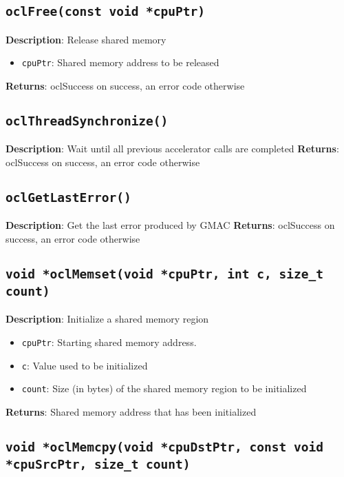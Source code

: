 \subsection{\texttt{oclFree(const void *cpuPtr)}}

\textbf{Description}: Release shared memory
\begin{itemize}
  \item \texttt{cpuPtr}: Shared memory address to be released
\end{itemize}
\textbf{Returns}: oclSuccess on success, an error code otherwise

\subsection{\texttt{oclThreadSynchronize()}}

\textbf{Description}: Wait until all previous accelerator calls are completed
\textbf{Returns}: oclSuccess on success, an error code otherwise

\subsection{\texttt{oclGetLastError()}}

\textbf{Description}: Get the last error produced by GMAC
\textbf{Returns}: oclSuccess on success, an error code otherwise

\subsection{\texttt{void *oclMemset(void *cpuPtr, int c, size\_t count)}}

\textbf{Description}: Initialize a shared memory region
\begin{itemize}
  \item \texttt{cpuPtr}: Starting shared memory address.
  \item \texttt{c}: Value used to be initialized
  \item \texttt{count}: Size (in bytes) of the shared memory region to be initialized
\end{itemize}
\textbf{Returns}: Shared memory address that has been initialized

\subsection{\texttt{void *oclMemcpy(void *cpuDstPtr, const void *cpuSrcPtr, size\_t count)}}

